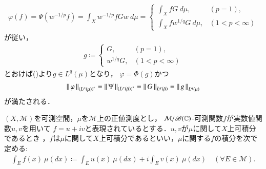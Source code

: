 \begin{prf}
\begin{description}
				\begin{align}
					\varphi(f) = \Psi\left( w^{-1/p} f \right)
					= \int_X w^{-1/p} f G w\ d\mu
					= \begin{cases}
						\displaystyle\int_X f G\ d\mu, & (p = 1), \\
						\displaystyle\int_X f w^{1/q} G\ d\mu, & (1 < p < \infty)
					\end{cases}
				\end{align}
				が従い，
				\begin{align}
					g \coloneqq
					\begin{cases}
						G, & (p = 1), \\
						w^{1/q} G, & (1 < p < \infty)
					\end{cases}
				\end{align}
				とおけば()より$g \in L^q(\mu)$となり，
				$\varphi = \Phi(g)$かつ
				\begin{align}
					\left\|\, \varphi\, \right\|_{\left( L^p(\mu) \right)^*} = \left\|\, \Psi\, \right\|_{\left( L^p(\tilde{\mu}) \right)^*}
					= \left\|\, G\, \right\|_{L^q(\tilde{\mu})}
					= \left\|\, g\, \right\|_{L^q(\mu)}
				\end{align}
				が満たされる．
				\QED
		\end{description}
	\end{prf}
	
	\begin{screen}
		\begin{dfn}[複素数値可測関数の正値測度に関する積分]
			$(X,\mathcal{M})$を可測空間，$\mu$を$\mathcal{M}$上の正値測度とし，
			$\mathcal{M}/\mathscr{B}(\mathbb{C})$-可測関数$f$が実数値関数$u,v$を用いて
			$f = u + i v$と表現されているとする．$u,v$が$\mu$に関して$X$上可積分であるとき\footnotemark
			，$f$は$\mu$に関して$X$上可積分であるといい，$\mu$に関する$f$の積分を次で定める:
			\begin{align}
				\int_E f(x)\ \mu(dx)
				\coloneqq \int_E u(x)\ \mu(dx) + i \int_E v(x)\ \mu(dx)
				\quad (\forall E \in \mathcal{M}).
			\end{align}
		\end{dfn}
	\end{screen}

	

